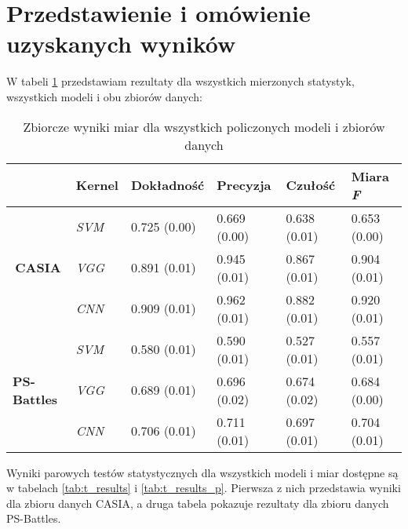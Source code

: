 \section {Przedstawienie i omówienie uzyskanych wyników}

W tabeli \ref{tab:all_result} przedstawiam rezultaty dla wszystkich mierzonych statystyk, wszystkich modeli i obu zbiorów danych:

\begin{table}[h!]
	\centering
	\begin{tabular}{l|l|l|l|l|l|}
		\cline{2-6}
		& \textbf{Kernel} & \textbf{Dokładność} & \textbf{Precyzja} & \textbf{Czułość} & \textbf{Miara \textit{F}} \\ \hline
		\multicolumn{1}{|c|}{\multirow{3}{*}{\textbf{CASIA}}}       & \textit{SVM} & 0.725 (0.00) & 0.669 (0.00) & 0.638 (0.01) & 0.653 (0.00) \\ \cline{2-6} 
		\multicolumn{1}{|c|}{} & \textit{VGG}    & 0.891 (0.01)        & 0.945 (0.01)      & 0.867 (0.01)     & 0.904 (0.01)     \\ \cline{2-6} 
		\multicolumn{1}{|c|}{} & \textit{CNN}    & 0.909 (0.01)        & 0.962 (0.01)      & 0.882 (0.01)     & 0.920 (0.01)     \\ \hline
		\multicolumn{1}{|l|}{\multirow{3}{*}{\textbf{PS-Battles}}} & \textit{SVM} & 0.580 (0.01) & 0.590 (0.01) & 0.527 (0.01) & 0.557 (0.01) \\ \cline{2-6} 
		\multicolumn{1}{|l|}{} & \textit{VGG}    & 0.689 (0.01)        & 0.696 (0.02)      & 0.674 (0.02)     & 0.684 (0.00)     \\ \cline{2-6} 
		\multicolumn{1}{|l|}{} & \textit{CNN}    & 0.706 (0.01)        & 0.711 (0.01)      & 0.697 (0.01)     & 0.704 (0.01)     \\ \hline
	\end{tabular}
	\caption{Zbiorcze wyniki miar dla wszystkich policzonych modeli i zbiorów danych}
	\label{tab:all_result}
\end{table}

Wyniki parowych testów statystycznych dla wszystkich modeli i miar dostępne są w tabelach \ref{tab:t_results} i \ref{tab:t_results_p}. Pierwsza z nich przedstawia wyniki dla zbioru danych CASIA, a druga tabela pokazuje rezultaty dla zbioru danych PS-Battles.

